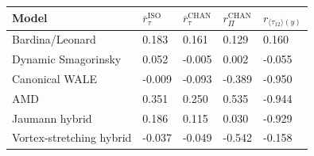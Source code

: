 \begin{tabular}{lllll}
\toprule
Model & $\overline{r}_{\tau}^{\mathrm{ISO}}$ & $\overline{r}_{\tau}^{\mathrm{CHAN}}$ & $r_{\Pi}^{\mathrm{CHAN}}$ & $r_{\langle \tau_{12} \rangle (y)}$ \\
\midrule
Bardina/Leonard & 0.183 & 0.161 & 0.129 & 0.160 \\
Dynamic Smagorinsky & 0.052 & -0.005 & 0.002 & -0.055 \\
Canonical WALE & -0.009 & -0.093 & -0.389 & -0.950 \\
AMD & 0.351 & 0.250 & 0.535 & -0.944 \\
Jaumann hybrid & 0.186 & 0.115 & 0.030 & -0.929 \\
Vortex-stretching hybrid & -0.037 & -0.049 & -0.542 & -0.158 \\
\bottomrule
\end{tabular}
